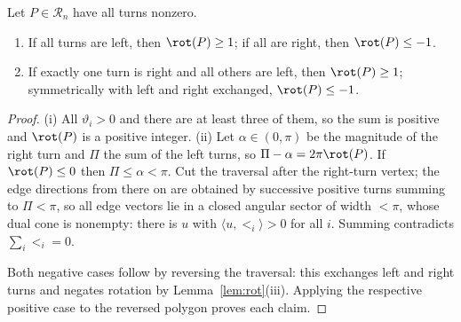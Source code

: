 \begin{lemma}\label{lem:uniformrot}\leanok
Let $P\in\mathcal R_n$ have all turns nonzero.
\begin{enumerate}
\item[(i)] If all turns are left, then $\rot(P)\geq1$; if all are right, then
$\rot(P)\leq-1$.
\item[(ii)] If exactly one turn is right and all others are left, then
$\rot(P)\geq1$; symmetrically with left and right exchanged, $\rot(P)\leq-1$.
\end{enumerate}

\end{lemma}
\begin{proof}\leanok{}
(i) All $\vartheta_i>0$ and there are at least three of them, so the sum is
positive and $\rot(P)$ is a positive integer. (ii) Let $\alpha\in(0,\pi)$ be
the magnitude of the right turn and $\Pi$ the sum of the left turns, so
$\Pi-\alpha=2\pi\rot(P)$. If $\rot(P)\leq0$ then $\Pi\leq\alpha<\pi$. Cut the
traversal after the right-turn vertex; the edge directions from there on are
obtained by successive positive turns summing to $\Pi<\pi$, so all edge
vectors lie in a closed angular sector of width $<\pi$, whose dual cone is
nonempty: there is $u$ with $\langle u,\lt_i\rangle>0$ for all $i$. Summing
contradicts $\sum_i\lt_i=0$.

Both negative cases follow by reversing the traversal: this exchanges left
and right turns and negates rotation by Lemma~\ref{lem:rot}(iii). Applying
the respective positive case to the reversed polygon proves each claim.
\end{proof}

